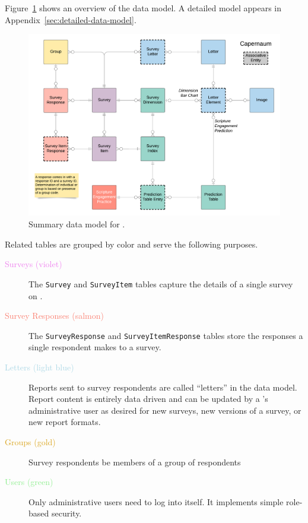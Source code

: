 \documentclass{article}
\begin{document}
Figure~\ref{fig:summary-data-model}
shows an overview of the \caper{} data model.
A detailed model appears in Appendix~\ref{sec:detailed-data-model}.
\begin{figure}
  \centering
  \includegraphics[width=\textwidth]{data-model-overview}
  \caption{Summary data model for \caper.}
  \label{fig:summary-data-model}
\end{figure}
Related tables are grouped by color
and serve the following purposes.
\begin{description}
\item[\textcolor{Violet}{Surveys (violet)}]
  The \texttt{Survey} and \texttt{SurveyItem} tables
  capture the details of a single survey on \qual.
\item[\textcolor{Salmon}{Survey Responses (salmon)}]
  The \texttt{SurveyResponse}
  and \texttt{Survey\-Item\-Re\-sponse}
  tables store the responses a single respondent
  makes to a survey.
\item[\textcolor{LightBlue}{Letters (light blue)}]
  Reports sent to survey respondents are called ``letters'' in the data model.
  Report content is entirely data driven and can be updated by a \caper's administrative user
  as desired for new surveys, new versions of a survey, or new report formats.
\item[\textcolor{Goldenrod}{Groups (gold)}]
  Survey respondents be members of a group of respondents
\item[\textcolor{LightGreen}{Users (green)}]
  Only administrative users need to log into \caper{} itself.
  It implements simple role-based security.
\end{description}
\end{document}
